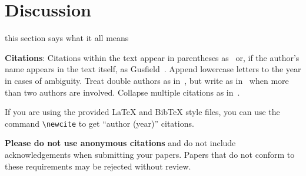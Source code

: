 \documentclass[11pt]{article}
\begin{document}
\section{Discussion}

this section says what it all means

{\bf Citations}: Citations within the text appear in parentheses
as~\cite{Gusfield:97} or, if the author's name appears in the text
itself, as Gusfield~.  Append lowercase letters
to the year in cases of ambiguity.  Treat double authors as
in~\cite{Aho:72}, but write as in~\cite{Chandra:81} when more than two
authors are involved. Collapse multiple citations as
in~\cite{Gusfield:97,Aho:72}.

If you are using the provided \LaTeX{} and Bib\TeX{} style files, you
can use the command \verb|\newcite| to get ``author (year)'' citations.

\textbf{Please do not use anonymous citations} and do not include
acknowledgements when submitting your papers. Papers that do not
conform to these requirements may be rejected without review.

%
%
\end{document}
